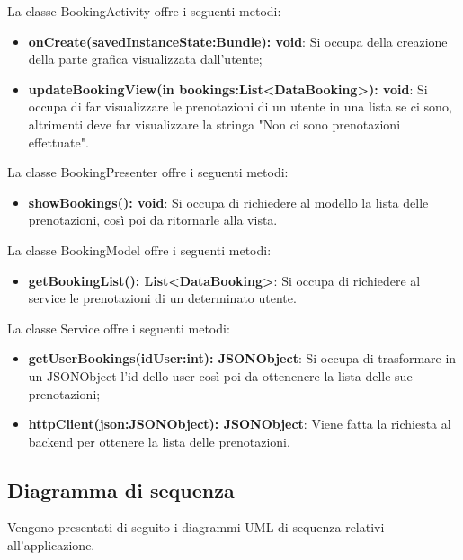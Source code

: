 La classe BookingActivity offre i seguenti metodi:
\begin{itemize}
	\item \textbf{onCreate(savedInstanceState:Bundle): void}: Si occupa della creazione della parte grafica visualizzata dall'utente; 
	\item \textbf{updateBookingView(in bookings:List<DataBooking>): void}: Si occupa di far visualizzare le prenotazioni di un utente in una lista se ci sono, altrimenti deve far visualizzare la stringa "Non ci sono prenotazioni effettuate". 
\end{itemize}

La classe BookingPresenter offre i seguenti metodi:
\begin{itemize}
	\item \textbf{showBookings(): void}: Si occupa di richiedere al modello la lista delle prenotazioni, così poi da ritornarle alla vista. 
\end{itemize}

La classe BookingModel offre i seguenti metodi:
\begin{itemize}
	\item \textbf{getBookingList(): List<DataBooking>}: Si occupa di richiedere al service le prenotazioni di un determinato utente. 
\end{itemize}

La classe Service offre i seguenti metodi:
\begin{itemize}
	\item \textbf{getUserBookings(idUser:int): JSONObject}: Si occupa di trasformare in un JSONObject l'id dello user così poi da ottenenere la lista delle sue prenotazioni;
	\item \textbf{httpClient(json:JSONObject): JSONObject}: Viene fatta la richiesta al backend per ottenere la lista delle prenotazioni.
 
\end{itemize}

\subsection{Diagramma di sequenza}
Vengono presentati di seguito i diagrammi UML di sequenza relativi all'applicazione.

